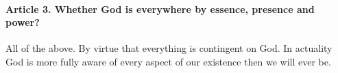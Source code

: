 \documentclass{ucetd}
\begin{document}
\paragraph{Article 3. Whether God is everywhere by essence, presence and power?}
All of the above. By virtue that everything is contingent on God. In actuality God is more fully aware of every aspect of our existence then we will ever be.
\end{document}
